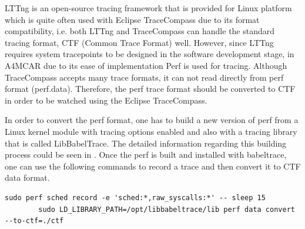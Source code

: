 \begin{itemize}
	LTTng \cite{lttng} is an open-source tracing framework that is provided for Linux platform which is quite often used with Eclipse TraceCompass due to its format compatibility, i.e. both LTTng and TraceCompass can handle the standard tracing format, CTF (Common Trace Format) well. However, since LTTng requires system tracepoints to be designed in the software development stage, in A4MCAR due to its ease of implementation Perf is used for tracing. Although TraceCompass accepts many trace formats, it can not read directly from perf format (perf.data). Therefore, the perf trace format should be converted to CTF in order to be watched using the Eclipse TraceCompass.
	
	In order to convert the perf format, one has to build a new version of perf from a Linux kernel module \cite{jolsa} with tracing options enabled and also with a tracing library that is called LibBabelTrace. The detailed information regarding this building process could be seen in \cite{perfbabeltrace}. Once the perf is built and installed with babeltrace, one can use the following commands to record a trace and then convert it to CTF data format. 
	\begin{lstlisting}[style=bash]
		sudo perf sched record -e 'sched:*,raw_syscalls:*' -- sleep 15
		sudo LD_LIBRARY_PATH=/opt/libbabeltrace/lib perf data convert --to-ctf=./ctf
	\end{lstlisting}
	

\end{itemize}
